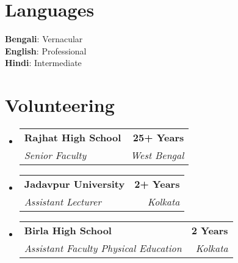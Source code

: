 \documentclass[letterpaper,11pt]{article}
\makeatletter
\newcommand{\resumeSubheading}[4]{
  \vspace{-2pt}\item
    \begin{tabular*}{1.0\textwidth}[t]{l@{\extracolsep{\fill}}r}
      \textbf{#1} & \textbf{\small #2} \\
      \textit{\small#3} & \textit{\small #4} \\
    \end{tabular*}\vspace{-7pt}
}
\newcommand{\resumeSubHeadingListStart}{\begin{itemize}[leftmargin=0.0in, label={}]}
\newcommand{\resumeSubHeadingListEnd}{\end{itemize}\vspace{0pt}}
\makeatother
\begin{document}
\section{Languages}
 \begin{itemize}[label={}]
    \small{\item{
     \textbf{Bengali}{: Vernacular} \\[1mm]
     \textbf{English}{: Professional} \\[1mm]
     \textbf{Hindi}{: Intermediate}
    }}
 \end{itemize}

\section{Volunteering}
  \resumeSubHeadingListStart
    \resumeSubheading{Rajhat High School}{25+ Years}
      {Senior Faculty}{West Bengal}
    \resumeSubheading{Jadavpur University}{2+ Years}
      {Assistant Lecturer}{Kolkata}
    \resumeSubheading{Birla High School}{2 Years}
      {Assistant Faculty Physical Education}{Kolkata}
  \resumeSubHeadingListEnd
\end{document}
